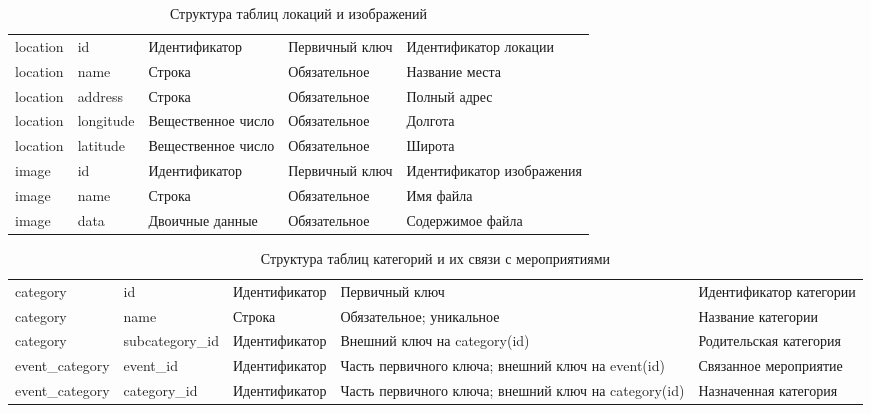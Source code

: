 \begin{table}[H]
    \caption{Структура таблиц локаций и изображений}
    \label{tab:design-resources}
    \small
    \begin{tabularx}{\textwidth}{|L{3.2cm}|L{2.8cm}|L{2.7cm}|Y|Y|}
        \hline
         &  &  &  &  \\
        \hline
        location & id & Идентификатор & Первичный ключ & Идентификатор локации \\
        \hline
        location & name & Строка & Обязательное & Название места \\
        \hline
        location & address & Строка & Обязательное & Полный адрес \\
        \hline
        location & longitude & Вещественное число & Обязательное & Долгота \\
        \hline
        location & latitude & Вещественное число & Обязательное & Широта \\
        \hline
        image & id & Идентификатор & Первичный ключ & Идентификатор изображения \\
        \hline
        image & name & Строка & Обязательное & Имя файла \\
        \hline
        image & data & Двоичные данные & Обязательное & Содержимое файла \\
        \hline
    \end{tabularx}
\end{table}

\begin{table}[H]
    \caption{Структура таблиц категорий и их связи с мероприятиями}
    \label{tab:design-categories}
    \small
    \begin{tabularx}{\textwidth}{|L{3.2cm}|L{2.8cm}|L{2.7cm}|Y|Y|}
        \hline
         &  &  &  &  \\
        \hline
        category & id & Идентификатор & Первичный ключ & Идентификатор категории \\
        \hline
        category & name & Строка & Обязательное; уникальное & Название категории \\
        \hline
        category & subcategory\_id & Идентификатор & Внешний ключ на category(id) & Родительская категория \\
        \hline
        event\_category & event\_id & Идентификатор & Часть первичного ключа; внешний ключ на event(id) & Связанное мероприятие \\
        \hline
        event\_category & category\_id & Идентификатор & Часть первичного ключа; внешний ключ на category(id) & Назначенная категория \\
        \hline
    \end{tabularx}
\end{table}

